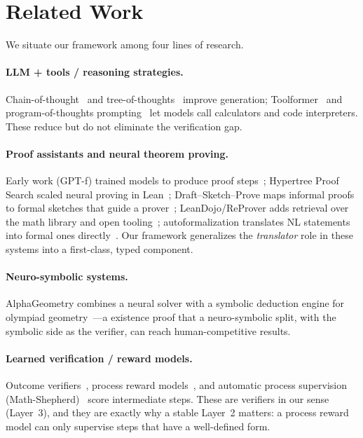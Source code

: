 \documentclass[11pt]{article}
\begin{document}
\section{Related Work}
\label{sec:related}

We situate our framework among four lines of research.

\paragraph{LLM + tools / reasoning strategies.}
Chain-of-thought~\cite{wei2022chain} and tree-of-thoughts~\cite{yao2023tree} improve
generation; Toolformer~\cite{schick2023toolformer} and program-of-thoughts
prompting~\cite{chen2022program} let models call calculators and code interpreters.
These reduce but do not eliminate the verification gap.

\paragraph{Proof assistants and neural theorem proving.}
Early work (GPT-f) trained models to produce proof steps~\cite{polu2020generating};
Hypertree Proof Search scaled neural proving in Lean~\cite{lample2022hypertree};
Draft--Sketch--Prove maps informal proofs to formal sketches that guide a
prover~\cite{jiang2023draft}; LeanDojo/ReProver adds retrieval over the math library
and open tooling~\cite{yang2023leandojo}; autoformalization translates NL statements into
formal ones directly~\cite{wu2022autoformalization}. Our framework generalizes the
\emph{translator} role in these systems into a first-class, typed component.

\paragraph{Neuro-symbolic systems.}
AlphaGeometry combines a neural solver with a symbolic deduction engine for olympiad
geometry~\cite{trinh2024alphageometry}---a existence proof that a neuro-symbolic split,
with the symbolic side as the verifier, can reach human-competitive results.

\paragraph{Learned verification / reward models.}
Outcome verifiers~\cite{cobbe2021training}, process reward models~\cite{lightman2024lets},
and automatic process supervision (Math-Shepherd)~\cite{wang2024mathshepherd} score
intermediate steps. These are verifiers in our sense (Layer~3), and they are exactly why
a stable Layer~2 matters: a process reward model can only supervise steps that have a
well-defined form.
\end{document}
